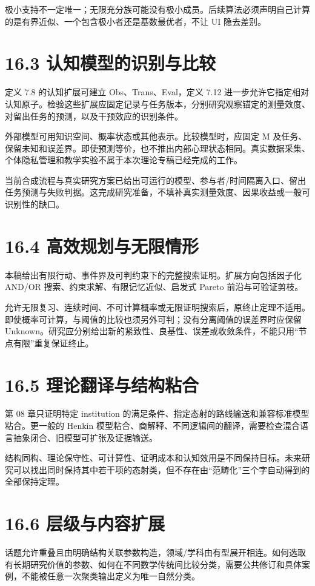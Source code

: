 \documentclass[UTF8,a4paper,zihao=-4,fontset=windows,openany]{ctexbook}
\begin{document}
极小支持不一定唯一；无限充分族可能没有极小成员。后续算法必须声明自己计算的是有界近似、一个包含极小者还是基数最优者，不让 UI 隐去差别。

\section{16.3 认知模型的识别与比较}
定义 7.8 的认知扩展可建立 Obs、Trans、Eval，定义 7.12 进一步允许它指定相对认知原子。检验这些扩展应固定记录与任务版本，分别研究观察锚定的测量效度、对留出任务的预测，以及干预效应的识别条件。

外部模型可用知识空间、概率状态或其他表示。比较模型时，应固定 M 及任务、保留未知和误差界。即使预测等价，也不推出内部心理状态相同。真实数据采集、个体隐私管理和教学实验不属于本次理论专稿已经完成的工作。

当前合成流程与真实研究方案已给出可运行的模型、参与者/时间隔离入口、留出任务预测与失败判据。这完成研究准备，不填补真实测量效度、因果收益或一般可识别性的缺口。

\section{16.4 高效规划与无限情形}
本稿给出有限行动、事件界及可判约束下的完整搜索证明。扩展方向包括因子化 AND/OR 搜索、约束求解、有限记忆近似、启发式 Pareto 前沿与可验证剪枝。

允许无限复习、连续时间、不可计算概率或无限证明搜索后，原终止定理不适用。即使概率可计算，与阈值的比较也须另外可判；没有分离阈值的误差界时应保留 Unknown。研究应分别给出新的紧致性、良基性、误差或收敛条件，不能只用“节点有限”重复保证终止。

\section{16.5 理论翻译与结构粘合}
第 08 章只证明特定 institution 的满足条件、指定态射的路线输送和兼容标准模型粘合。更一般的 Henkin 模型粘合、商解释、不同逻辑间的翻译，需要检查混合语言抽象闭合、旧模型可扩张及证据输送。

结构同构、理论保守性、可计算性、证明成本和认知效用是不同保持目标。未来研究可以找出同时保持其中若干项的态射类，但不存在由“范畴化”三个字自动得到的全部保持定理。

\section{16.6 层级与内容扩展}
话题允许重叠且由明确结构关联参数构造，领域/学科由有型展开相连。如何选取有长期研究价值的参数、如何在不同数学传统间比较分类，需要公共修订和具体案例，不能被任意一次聚类输出定义为唯一自然分类。
\end{document}
